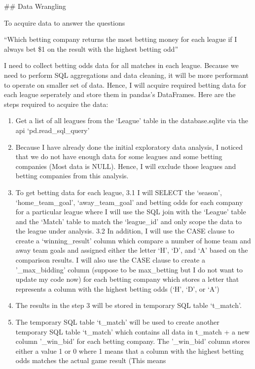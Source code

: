 \documentclass[11pt]{article}
\begin{document}
     \#\# Data Wrangling

To acquire data to answer the questions

``Which betting company returns the most betting money for each league
if I always bet \$1 on the result with the highest betting odd''

I need to collect betting odds data for all matches in each league.
Because we need to perform SQL aggregations and data cleaning, it will
be more performant to operate on smaller set of data. Hence, I will
acquire required betting data for each league seperately and store them
in pandas's DataFrames. Here are the steps required to acquire the data:

\begin{enumerate}
\def\labelenumi{\arabic{enumi}.}
\item
  Get a list of all leagues from the `League' table in the
  database.sqlite via the api `pd.read\_sql\_query'
\item
  Because I have already done the initial exploratory data analysis, I
  noticed that we do not have enough data for some leagues and some
  betting companies (Most data is NULL). Hence, I will exclude those
  leagues and betting companies from this analysis.
\item
  To get betting data for each league, 3.1 I will SELECT the `season',
  `home\_team\_goal', `away\_team\_goal' and betting odds for each
  company for a particular league where I will use the SQL join with the
  `League' table and the `Match' table to match the `league\_id' and
  only scope the data to the league under analysis. 3.2 In addition, I
  will use the CASE clause to create a `winning\_result' column which
  compare a number of home team and away team goals and assigned either
  the letter `H', `D', and `A' based on the comparison results. I will
  also use the CASE clause to create a '\_max\_bidding' column (suppose
  to be max\_betting but I do not want to update my code now) for each
  betting company which stores a letter that represents a column with
  the highest betting odds (`H', `D', or `A')
\item
  The results in the step 3 will be stored in temporary SQL table
  `t\_match'.
\item
  The temporary SQL table `t\_match' will be used to create another
  temporary SQL table `t\_match' which contains all data in t\_match + a
  new column '\_win\_bid' for each betting company. The '\_win\_bid'
  column stores either a value 1 or 0 where 1 means that a column with
  the highest betting odds matches the actual game result (This means

\end{enumerate}
\end{document}
